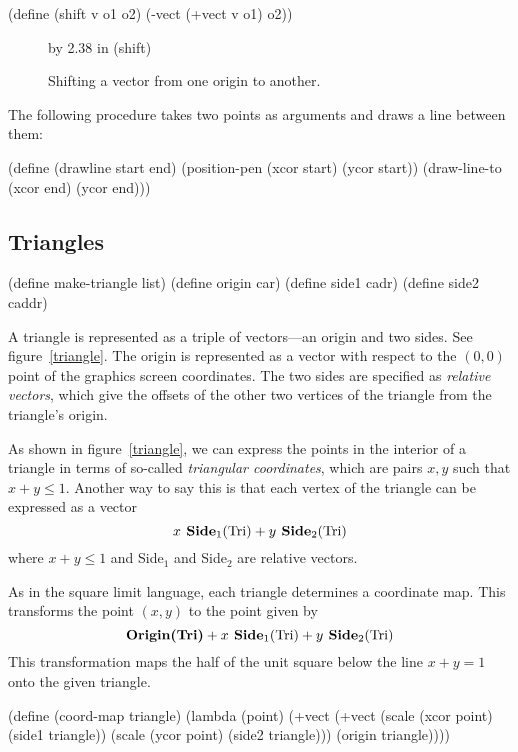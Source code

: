 \beginlisp
(define (shift v o1 o2)
  (-vect (+vect v o1) o2))
\endlisp

\begin{figure}
\picture 2.54in by 2.38 in (shift)
\caption{{\protect\footnotesize
Shifting a vector from one origin to another.}}
\label{shift-vector}
\end{figure} 

The following procedure takes two points as arguments and draws a line
between them:

\beginlisp
(define (drawline start end)
  (position-pen (xcor start) (ycor start))
  (draw-line-to (xcor end) (ycor end)))
\endlisp

\subsection{Triangles}

\beginlisp
(define make-triangle list)
\null
(define origin car)
(define side1 cadr)
(define side2 caddr)
\endlisp

A triangle is represented as a triple of vectors---an origin and two
sides.  See figure~\ref{triangle}.  The origin is represented as a vector
with respect to the $(0,0)$ point of the graphics screen coordinates.  The
two sides are specified as {\em relative vectors}, which give the offsets
of the other two vertices of the triangle from the triangle's origin.

As shown in figure~\ref{triangle}, we can express the points in the
interior of a triangle in terms of so-called {\it triangular
coordinates}, which are pairs $x, y$ such that $x+y \leq 1$.  Another
way to say this is that each vertex of the triangle can be expressed
as a vector
\begin{displaymath}
x \hbox{\bf\  Side}_1(\hbox{\rm Tri}) + y \hbox{\bf\ Side}_2(\hbox{\rm Tri})
\end{displaymath}
where $x+y\leq 1$ and Side$_1$ and Side$_2$ are relative vectors.

As in the square limit language, each triangle determines a coordinate
map.  This transforms the point $(x, y)$ to the point given by
\begin{displaymath}
\hbox{\bf Origin(Tri)} + x \hbox{\bf\  Side}_1\hbox{\rm (Tri)}
+ y \hbox{\bf\ Side}_2\hbox{\rm (Tri)} 
\end{displaymath}
This transformation maps the half of the unit square below the line
$x+y=1$ onto the given triangle.

\beginlisp
(define (coord-map triangle)
  (lambda (point)
    (+vect
     (+vect (scale (xcor point)
                   (side1 triangle))
            (scale (ycor point)
                   (side2 triangle)))
     (origin triangle))))
\endlisp


